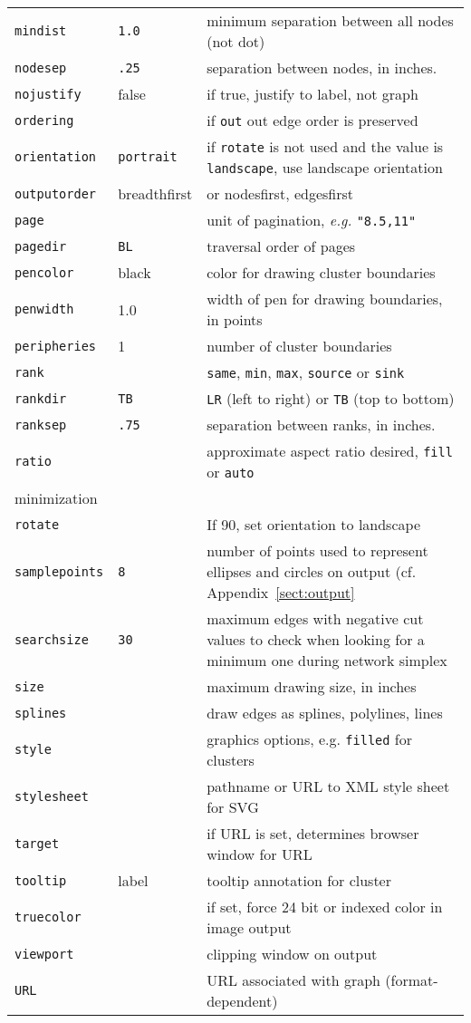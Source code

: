 \documentclass[11pt]{article}
\begin{document}
{{\begin{tabular}[t]{|l|l|p{3.5in}|}
{\tt mindist} & {\tt 1.0} & minimum separation between all nodes (not dot)\\
{\tt nodesep} & {\tt .25} & separation between nodes, in inches. \\
{\tt nojustify} & false & if true, justify to label, not graph \\
{\tt ordering} & & if {\tt out} out edge order is preserved \\
{\tt orientation} & {\tt portrait} & if {\tt rotate} is not used and the value
is {\tt landscape}, use landscape orientation \\
{\tt outputorder} & breadthfirst & or nodesfirst, edgesfirst \\
{\tt page} & & unit of pagination, {\it e.g.} {\tt "8.5,11"} \\
{\tt pagedir} & {\tt BL} & traversal order of pages \\
{\tt pencolor} & black & color for drawing cluster boundaries \\
{\tt penwidth} & 1.0 & width of pen for drawing boundaries, in points \\
{\tt peripheries} & 1 & number of cluster boundaries \\
{\tt rank} & & {\tt same}, {\tt min}, {\tt max}, {\tt source} or {\tt sink} \\
{\tt rankdir} & {\tt TB} & {\tt LR} (left to right) or {\tt TB} (top to bottom) \\
{\tt ranksep} & {\tt .75} & separation between ranks, in inches. \\
{\tt ratio} & & approximate aspect ratio desired, {\tt fill} or {\tt auto} \\
minimization \\
{\tt rotate} & & If 90, set orientation to landscape \\
{\tt samplepoints} & {\tt 8} & number of points used to represent ellipses
and circles on output (cf.  Appendix~\ref{sect:output} \\
{\tt searchsize} & {\tt 30} & maximum edges with negative cut values to
check when looking for a minimum one during network simplex \\
{\tt size} & & maximum drawing size, in inches \\
{\tt splines} & & draw edges as splines, polylines, lines \\
{\tt style} & & graphics options, e.g. {\tt filled} for clusters \\
{\tt stylesheet} & & pathname or URL to XML style sheet for SVG \\
{\tt target} & & if URL is set, determines browser window for URL \\
{\tt tooltip} & label & tooltip annotation for cluster \\
{\tt truecolor} &  & if set, force 24 bit or indexed color in image output \\
{\tt viewport} &  & clipping window on output \\
{\tt URL} & & URL associated with graph (format-dependent) \\
\hline
\end{tabular}
}

}
\end{document}
